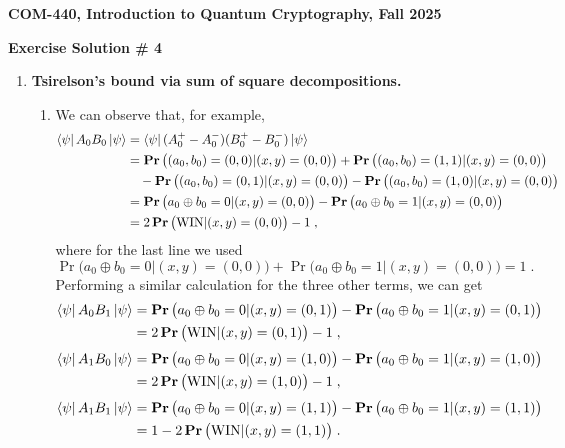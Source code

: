 \documentclass[12pt]{article}
\newcommand{\header}[1]{\begin{center} {\large\bf #1} \end{center}}
\begin{document}
\header{COM-440, Introduction to Quantum Cryptography, Fall 2025}
\header{\bf Exercise Solution \# 4}


\begin{enumerate}

\item \textbf{Tsirelson's bound via sum of square decompositions. }
\begin{enumerate}
\item We can observe that, for example, 
\begin{align*}
\bra{\psi} A_0 B_0 \ket{\psi} &=\bra{\psi} (A_0^+-A_0^-) (B_0^+-B_0^-) \ket{\psi}\\
&= \mathop{\bf Pr\/}\big((a_0,b_0)=(0,0) | (x,y)=(0,0)\big)+\mathop{\bf Pr\/}\big((a_0,b_0)=(1,1) | (x,y)=(0,0)\big)\\
&\quad - \mathop{\bf Pr\/}\big((a_0,b_0)=(0,1) | (x,y)=(0,0)\big)-\mathop{\bf Pr\/}\big((a_0,b_0)=(1,0) | (x,y)=(0,0)\big) \\
&= \mathop{\bf Pr\/}\big(a_0\oplus b_0=0 | (x,y)=(0,0)\big) - \mathop{\bf Pr\/}\big(a_0\oplus b_0=1 | (x,y)=(0,0)\big)\\
&= 2\mathop{\bf Pr\/}\big(\text{WIN}| (x,y)=(0,0)\big)-1\;,
\end{align*}
where for the last line we used 
\[ \Pr\big(a_0\oplus b_0=0 | (x,y)=(0,0)\big) + \Pr\big(a_0\oplus b_0=1 | (x,y)=(0,0)\big)= 1 \;.\]
Performing a similar calculation for the three other terms, we can get
\begin{align*}
\bra{\psi} A_0 B_1 \ket{\psi}
&= \mathop{\bf Pr\/}\big(a_0\oplus b_0=0 | (x,y)=(0,1)\big) - \mathop{\bf Pr\/}\big(a_0\oplus b_0=1 | (x,y)=(0,1)\big)\\
&= 2\mathop{\bf Pr\/}\big(\text{WIN}| (x,y)=(0,1)\big)-1\;,
\end{align*}
\begin{align*}
\bra{\psi} A_1 B_0 \ket{\psi}
&= \mathop{\bf Pr\/}\big(a_0\oplus b_0=0 | (x,y)=(1,0)\big) - \mathop{\bf Pr\/}\big(a_0\oplus b_0=1 | (x,y)=(1,0)\big)\\
&= 2\mathop{\bf Pr\/}\big(\text{WIN}| (x,y)=(1,0)\big)-1\;,
\end{align*}
\begin{align*}
\bra{\psi} A_1 B_1 \ket{\psi}
&= \mathop{\bf Pr\/}\big(a_0\oplus b_0=0 | (x,y)=(1,1)\big) - \mathop{\bf Pr\/}\big(a_0\oplus b_0=1 | (x,y)=(1,1)\big)\\
&= 1 - 2\mathop{\bf Pr\/}\big(\text{WIN}| (x,y)=(1,1)\big)\;.
\end{align*}


\end{enumerate}
\end{enumerate}
\end{document}
